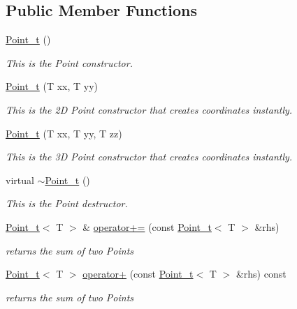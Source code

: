 \subsection*{Public Member Functions}
\begin{DoxyCompactItemize}
\item 
\hyperlink{class_point__t_a6a0871ca8592da56fae8dd0fde4dcc5d}{Point\+\_\+t} ()
\begin{DoxyCompactList}\small\item\em This is the Point constructor. \end{DoxyCompactList}\item 
\hyperlink{class_point__t_a74da469bad09c76462acae8e1b5f1a28}{Point\+\_\+t} (T xx, T yy)
\begin{DoxyCompactList}\small\item\em This is the 2D Point constructor that creates coordinates instantly. \end{DoxyCompactList}\item 
\hyperlink{class_point__t_ae825adbedce7f428b150eaa5454469e0}{Point\+\_\+t} (T xx, T yy, T zz)
\begin{DoxyCompactList}\small\item\em This is the 3D Point constructor that creates coordinates instantly. \end{DoxyCompactList}\item 
virtual \hyperlink{class_point__t_ae05b28ed42a34a491fd8a2a94500b51f}{$\sim$\+Point\+\_\+t} ()
\begin{DoxyCompactList}\small\item\em This is the Point destructor. \end{DoxyCompactList}\item 
\hyperlink{class_point__t}{Point\+\_\+t}$<$ T $>$ \& \hyperlink{class_point__t_abd0017d51000570cf8c5b071ef37aeb4}{operator+=} (const \hyperlink{class_point__t}{Point\+\_\+t}$<$ T $>$ \&rhs)
\begin{DoxyCompactList}\small\item\em returns the sum of two Points \end{DoxyCompactList}\item 
\hyperlink{class_point__t}{Point\+\_\+t}$<$ T $>$ \hyperlink{class_point__t_afac8b7bed8c8b0f6b5bcbbf3ae1362d9}{operator+} (const \hyperlink{class_point__t}{Point\+\_\+t}$<$ T $>$ \&rhs) const
\begin{DoxyCompactList}\small\item\em returns the sum of two Points \end{DoxyCompactList}\item 

\end{DoxyCompactItemize}

